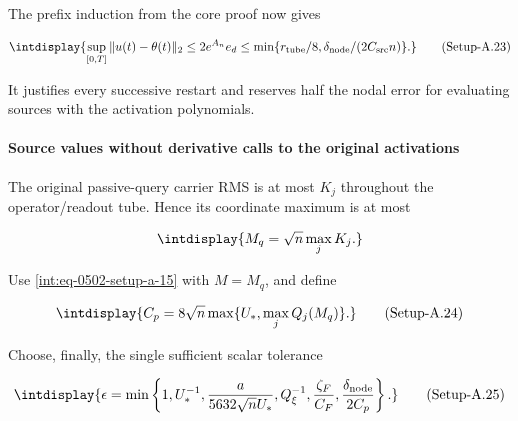 
The prefix induction from the core proof now gives


\label{int:eq-setup-a-23}
\begingroup\renewcommand{\theHequation}{intdisplay.989}
\begin{equation}
\intdisplay{
\sup_{[0,T]}\|u(t)-\theta(t)\|_2
\le2e^{A_n}e_d
\le\min\{r_{\rm tube}/8,\delta_{\rm node}/(2C_{\rm src}n)\}.
}
\tag{Setup-A.23}
\label{int:eq-0510-setup-a-23}
\end{equation}
\endgroup


It justifies every successive restart and reserves half the nodal error for evaluating sources with the activation polynomials.


\paragraph{Source values without derivative calls to the original activations}
\label{int:setup-activation-5}
\mbox{}\par\smallskip


The original passive-query carrier RMS is at most \(K_j\) throughout the operator/readout tube. Hence its coordinate maximum is at most


\begingroup\renewcommand{\theHequation}{intdisplay.990}
\begin{equation*}
\intdisplay{
M_q=\sqrt n\max_jK_j.
}
\end{equation*}
\endgroup


Use \hyperref[int:eq-setup-a-15]{\eqref{int:eq-0502-setup-a-15}} with \(M=M_q\), and define


\label{int:eq-setup-a-24}
\begingroup\renewcommand{\theHequation}{intdisplay.991}
\begin{equation}
\intdisplay{
C_p=8\sqrt n\max\{U_*,\max_jQ_j(M_q)\}.
}
\tag{Setup-A.24}
\label{int:eq-0511-setup-a-24}
\end{equation}
\endgroup


Choose, finally, the single sufficient scalar tolerance


\label{int:eq-setup-a-25}
\begingroup\renewcommand{\theHequation}{intdisplay.992}
\begin{equation}
\intdisplay{
\epsilon=\min\left\{1,U_*^{-1},
\frac{a}{5632\sqrt nU_*},Q_\xi^{-1},
\frac{\zeta_F}{C_F},\frac{\delta_{\rm node}}{2C_p}\right\}.
}
\tag{Setup-A.25}
\label{int:eq-0512-setup-a-25}
\end{equation}
\endgroup

